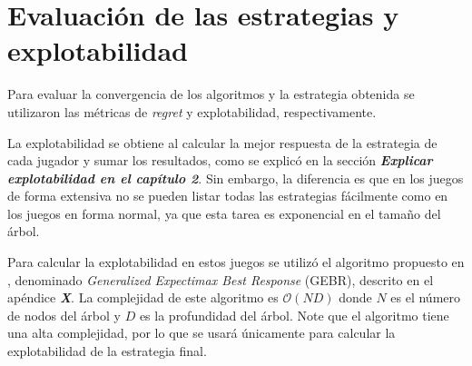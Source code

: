 \section{Evaluación de las estrategias y explotabilidad}

Para evaluar la convergencia de los algoritmos y la estrategia obtenida se utilizaron las métricas de \textit{regret} y explotabilidad, respectivamente.

La explotabilidad se obtiene al calcular la mejor respuesta de la estrategia de cada jugador y sumar los resultados, como se explicó en la sección \textit{\textbf{Explicar explotabilidad en el capítulo 2}}. Sin embargo, la diferencia es que en los juegos de forma extensiva no se pueden listar todas las estrategias fácilmente como en los juegos en forma normal, ya que esta tarea es exponencial en el tamaño del árbol.

Para calcular la explotabilidad en estos juegos se utilizó el algoritmo propuesto en \cite{bib:thesis-marc-lanctot}, denominado \textit{Generalized Expectimax Best Response} (GEBR), descrito en el apéndice \textit{\textbf{X}}. La complejidad de este algoritmo es $\mathcal{O}(ND)$ donde $N$ es el número de nodos del árbol y $D$ es la profundidad del árbol. Note que el algoritmo tiene una alta complejidad, por lo que se usará únicamente para calcular la explotabilidad de la estrategia final.